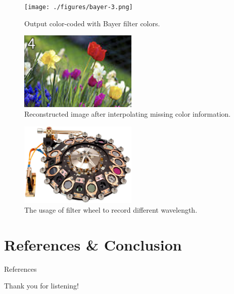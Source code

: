 \documentclass{loyola-beamer}
\begin{document}
\begin{frame}
	\begin{figure}
		\begin{center}
			\texttt{[image: ./figures/bayer-3.png]}
		\end{center}
		\caption{Output color-coded with Bayer filter colors.}
	\end{figure}
\end{frame}

\begin{frame}
	\begin{figure}
		\begin{center}
			\includegraphics[width=0.5\textwidth]{./figures/bayer-4.png}
		\end{center}
		\caption{Reconstructed image after interpolating missing color information.}
	\end{figure}
\end{frame}

\begin{frame}
	\begin{figure}
		\begin{center}
			\includegraphics[width=0.5\textwidth]{./figures/filter-wheel-MIRI.jpg}
		\end{center}
		\caption{The usage of filter wheel to record different wavelength.}
	\end{figure}
\end{frame}
\section{References \& Conclusion}

\begin{frame}{References}
	
	
\end{frame}

\begin{titleframe}{Thank you for listening!}
\end{titleframe}
\end{document}
